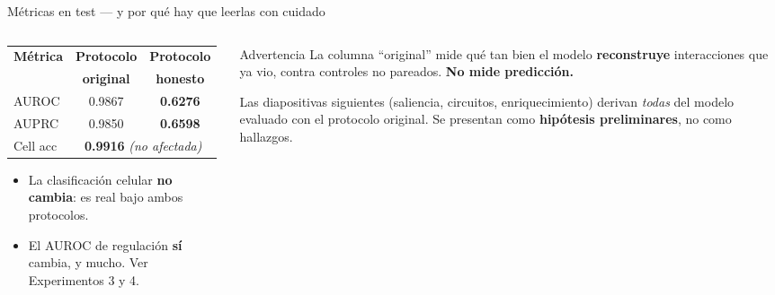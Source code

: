\begin{frame}{M\'etricas en test --- y por qu\'e hay que leerlas con cuidado}
  \begin{columns}[T]
    \begin{column}{0.52\textwidth}
      \small
      \begin{tabular}{lcc}
        \toprule
        \textbf{M\'etrica} & \textbf{Protocolo} & \textbf{Protocolo} \\
                           & \textbf{original} & \textbf{honesto} \\
        \midrule
        AUROC   & 0.9867 & \textbf{0.6276} \\
        AUPRC   & 0.9850 & \textbf{0.6598} \\
        Cell acc & \multicolumn{2}{c}{\textbf{0.9916} \emph{(no afectada)}} \\
        \bottomrule
      \end{tabular}

      \vspace{0.6em}
      \begin{itemize}
        \scriptsize
        \item La clasificaci\'on celular \textbf{no cambia}: es real bajo ambos protocolos.
        \item El AUROC de regulaci\'on \textbf{s\'i} cambia, y mucho. Ver Experimentos 3 y 4.
      \end{itemize}
    \end{column}
    \begin{column}{0.45\textwidth}
      \begin{block}{Advertencia}
        \scriptsize
        La columna ``original'' mide qu\'e tan bien el modelo \textbf{reconstruye} interacciones que ya vio, contra controles no pareados. \textbf{No mide predicci\'on.}

        \vspace{0.2em}
        Las diapositivas siguientes (saliencia, circuitos, enriquecimiento) derivan \emph{todas} del modelo evaluado con el protocolo original. Se presentan como \textbf{hip\'otesis preliminares}, no como hallazgos.
      \end{block}
    \end{column}
  \end{columns}
\end{frame}

